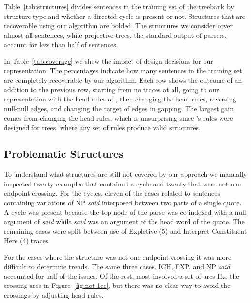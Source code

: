 Table~\ref{tab:structures} divides sentences in the training set of the treebank by structure type and whether a directed cycle is present or not.
Structures that are recoverable using our algorithm are bolded.
The structures we consider cover almost all sentences, while projective trees, the standard output of parsers, account for less than half of sentences.

In Table~\ref{tab:coverage} we show the impact of design decisions for our representation.
The percentages indicate how many sentences in the training set are completely recoverable by our algorithm.
Each row shows the outcome of an addition to the previous row, starting from no traces at all, going to our representation with the head rules of \textcite{cck}, then changing the head rules, reversing null-null edges, and changing the target of edges in gapping.
The largest gain comes from changing the head rules, which is unsurprising since \textcite{cck}'s rules were designed for trees, where any set of rules produce valid structures.

\subsection{Problematic Structures}

To understand what structures are still not covered by our approach we manually inspected twenty examples that contained a cycle and twenty that were not one-endpoint-crossing.
For the cycles, eleven of the cases related to sentences containing variations of NP \emph{said} interposed between two parts of a single quote.
A cycle was present because the top node of the parse was co-indexed with a null argument of \emph{said} while \emph{said} was an argument of the head word of the quote.
The remaining cases were split between use of Expletive (5) and Interpret Constituent Here (4) traces.

For the cases where the structure was not one-endpoint-crossing it was more difficult to determine trends.
The same three cases, ICH, EXP, and NP \emph{said} accounted for half of the issues.
Of the rest, most involved a set of arcs like the crossing arcs in Figure~\ref{fig:not-1ec}, but there was no clear way to avoid the crossings by adjusting head rules.

